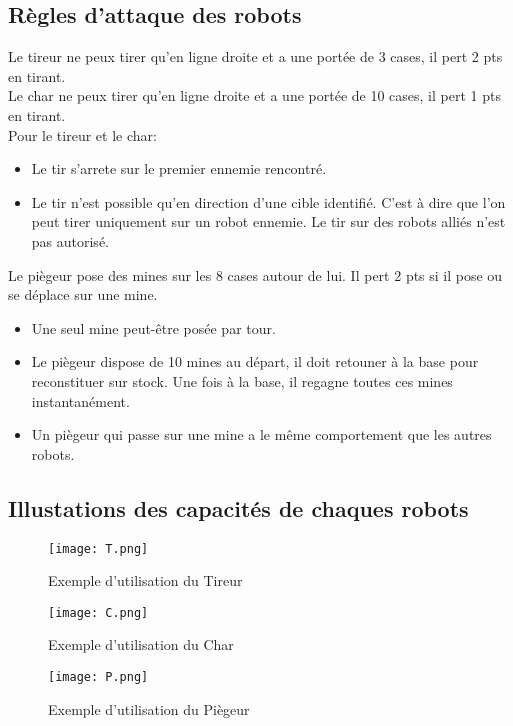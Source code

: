 \documentclass[12pt,a4paper]{article}
\begin{document}
		\subsection{Règles d'attaque des robots}
			Le tireur ne peux tirer qu'en ligne droite et a une portée de 3 cases, il pert 2 pts en tirant.\\
			Le char ne peux tirer qu'en ligne droite et a une portée de 10 cases, il pert 1 pts en tirant. \\
			Pour le tireur et le char:
			\begin{itemize}
				\item Le tir s'arrete sur le premier ennemie rencontré.
				\item Le tir n'est possible qu'en direction d'une cible identifié. C'est à dire que l'on peut tirer uniquement sur un robot ennemie. Le tir sur des robots alliés n'est pas autorisé.
			\end{itemize}
			Le piègeur pose des mines sur les 8 cases autour de lui. Il pert 2 pts si il pose ou se déplace sur une mine.
			\begin{itemize}
				\item Une seul mine peut-être posée par tour.
				\item Le piègeur dispose de 10 mines au départ, il doit retouner à la base pour reconstituer sur stock. Une fois à la base, il regagne toutes ces mines instantanément.
				\item Un piègeur qui passe sur une mine a le même comportement que les autres robots.
			\end{itemize}
		\subsection{Illustations des capacités de chaques robots}
			\begin{figure}[!h]
				\texttt{[image: T.png]}
				\caption{Exemple d'utilisation du Tireur}
				\label{Exemple d'utilisation du Tireur}
			\end{figure}

			\begin{figure}[!h]
				\texttt{[image: C.png]}
				\caption{Exemple d'utilisation du Char}
				\label{Exemple d'utilisation du Char}
			\end{figure}
	
			\begin{figure}[!h]
				\texttt{[image: P.png]}	
				\caption{Exemple d'utilisation du Piègeur}
				\label{Exemple d'utilisation du Piègeur}
			\end{figure}
				
\end{document}

